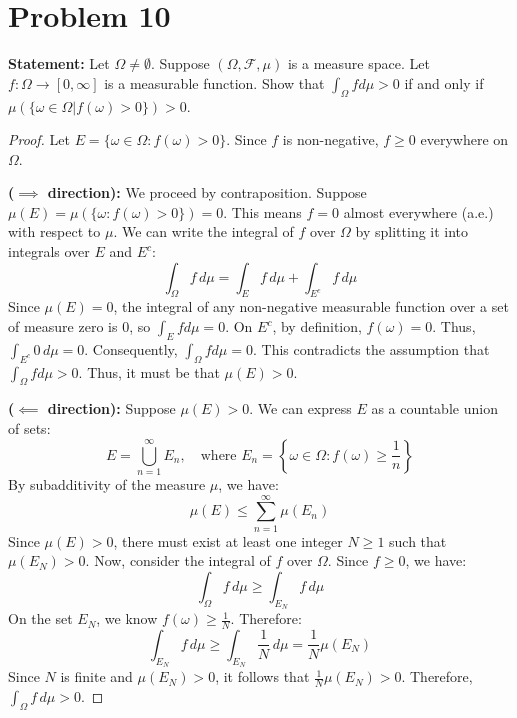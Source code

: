 \documentclass[12pt]{article}
\begin{document}
\section*{Problem 10}
\textbf{Statement:} Let $\Omega\ne\emptyset$. Suppose $(\Omega, \mathcal{F}, \mu)$ is a measure space. Let $f:\Omega\rightarrow [0,\infty]$ is a measurable function. Show that $\int_{\Omega}fd\mu>0$ if and only if $\mu(\{\omega\in\Omega|f(\omega)>0\})>0$.

\begin{proof}
Let $E = \{\omega \in \Omega : f(\omega) > 0\}$. Since $f$ is non-negative, $f \ge 0$ everywhere on $\Omega$.

\textbf{($\implies$ direction):} 
We proceed by contraposition. Suppose $\mu(E) = \mu(\{\omega : f(\omega) > 0\}) = 0$. 
This means $f = 0$ almost everywhere (a.e.) with respect to $\mu$. We can write the integral of $f$ over $\Omega$ by splitting it into integrals over $E$ and $E^c$:
\[
\int_\Omega f \, d\mu = \int_E f \, d\mu + \int_{E^c} f \, d\mu
\]
Since $\mu(E) = 0$, the integral of any non-negative measurable function over a set of measure zero is $0$, so $\int_E f d\mu = 0$. 
On $E^c$, by definition, $f(\omega) = 0$. Thus, $\int_{E^c} 0 \, d\mu = 0$. 
Consequently, $\int_\Omega f d\mu = 0$. This contradicts the assumption that $\int_\Omega f d\mu > 0$. Thus, it must be that $\mu(E) > 0$.

\textbf{($\impliedby$ direction):}
Suppose $\mu(E) > 0$. We can express $E$ as a countable union of sets:
\[
E = \bigcup_{n=1}^\infty E_n, \quad \text{where } E_n = \left\{\omega \in \Omega : f(\omega) \ge \frac{1}{n}\right\}
\]
By subadditivity of the measure $\mu$, we have:
\[
\mu(E) \le \sum_{n=1}^\infty \mu(E_n)
\]
Since $\mu(E) > 0$, there must exist at least one integer $N \ge 1$ such that $\mu(E_N) > 0$. 
Now, consider the integral of $f$ over $\Omega$. Since $f \ge 0$, we have:
\[
\int_\Omega f \, d\mu \ge \int_{E_N} f \, d\mu
\]
On the set $E_N$, we know $f(\omega) \ge \frac{1}{N}$. Therefore:
\[
\int_{E_N} f \, d\mu \ge \int_{E_N} \frac{1}{N} \, d\mu = \frac{1}{N} \mu(E_N)
\]
Since $N$ is finite and $\mu(E_N) > 0$, it follows that $\frac{1}{N} \mu(E_N) > 0$. Therefore, $\int_\Omega f \, d\mu > 0$.
\end{proof}
\end{document}
